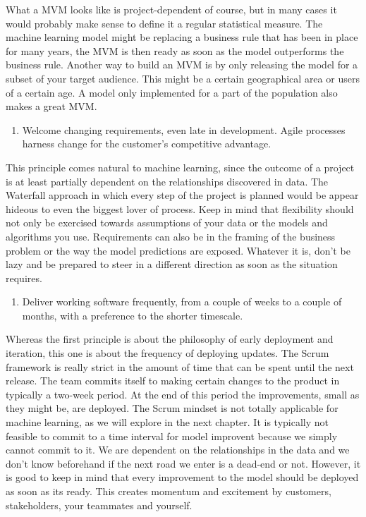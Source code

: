 \documentclass[]{book}
\providecommand{\tightlist}{%
  \setlength{\itemsep}{0pt}\setlength{\parskip}{0pt}}
\begin{document}
What a MVM looks like is project-dependent of course, but in many cases it would probably make sense to define it a regular statistical measure. The machine learning model might be replacing a business rule that has been in place for many years, the MVM is then ready as soon as the model outperforms the business rule. Another way to build an MVM is by only releasing the model for a subset of your target audience. This might be a certain geographical area or users of a certain age. A model only implemented for a part of the population also makes a great MVM.

\begin{enumerate}
\def\labelenumi{\arabic{enumi})}
\setcounter{enumi}{1}
\tightlist
\item
  Welcome changing requirements, even late in development. Agile processes harness change for the customer's competitive advantage.
\end{enumerate}

This principle comes natural to machine learning, since the outcome of a project is at least partially dependent on the relationships discovered in data. The Waterfall approach in which every step of the project is planned would be appear hideous to even the biggest lover of process. Keep in mind that flexibility should not only be exercised towards assumptions of your data or the models and algorithms you use. Requirements can also be in the framing of the business problem or the way the model predictions are exposed. Whatever it is, don't be lazy and be prepared to steer in a different direction as soon as the situation requires.

\begin{enumerate}
\def\labelenumi{\arabic{enumi})}
\setcounter{enumi}{2}
\tightlist
\item
  Deliver working software frequently, from a couple of weeks to a couple of months, with a preference to the shorter timescale.
\end{enumerate}

Whereas the first principle is about the philosophy of early deployment and iteration, this one is about the frequency of deploying updates. The Scrum framework is really strict in the amount of time that can be spent until the next release. The team commits itself to making certain changes to the product in typically a two-week period. At the end of this period the improvements, small as they might be, are deployed. The Scrum mindset is not totally applicable for machine learning, as we will explore in the next chapter. It is typically not feasible to commit to a time interval for model improvent because we simply cannot commit to it. We are dependent on the relationships in the data and we don't know beforehand if the next road we enter is a dead-end or not. However, it is good to keep in mind that every improvement to the model should be deployed as soon as its ready. This creates momentum and excitement by customers, stakeholders, your teammates and yourself.
\end{document}
